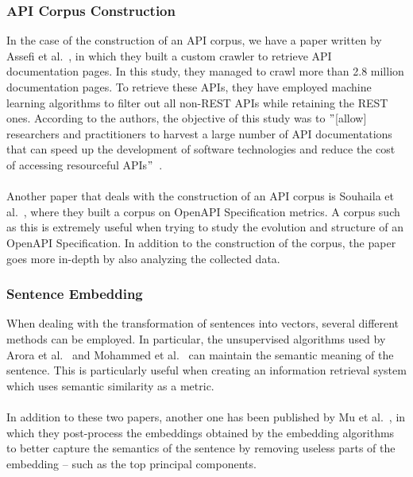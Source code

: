 \subsubsection{API Corpus Construction}
In the case of the construction of an API corpus, we have a paper written by Assefi et al.~\cite{assefi_intelligent_2022}, in which they built a custom crawler to retrieve API documentation pages.
In this study, they managed to crawl more than 2.8 million documentation pages.
To retrieve these APIs, they have employed machine learning algorithms to filter out all non-REST APIs while retaining the REST ones.
According to the authors, the objective of this study was to \("\)[allow] researchers and practitioners to harvest a large number of API documentations that can speed up the development of software technologies and reduce the cost of accessing resourceful APIs\("\)~\cite{assefi_intelligent_2022}. \\ \\
Another paper that deals with the construction of an API corpus is Souhaila et al.~\cite{souhaila_serbout_apistic_2024}, where they built a corpus on OpenAPI Specification metrics.
A corpus such as this is extremely useful when trying to study the evolution and structure of an OpenAPI Specification.
In addition to the construction of the corpus, the paper goes more in-depth by also analyzing the collected data.

\subsubsection{Sentence Embedding}
When dealing with the transformation of sentences into vectors, several different methods can be employed.
In particular, the unsupervised algorithms used by Arora et al.~\cite{arora_simple_2019} and Mohammed et al.~\cite{mohammed_state---art_2021} can maintain the semantic meaning of the sentence.
This is particularly useful when creating an information retrieval system which uses semantic similarity as a metric. \\ \\
In addition to these two papers, another one has been published by Mu et al.~\cite{mu_all-but--top_2018}, in which they post-process the embeddings obtained by the embedding algorithms to better capture the semantics of the sentence by removing useless parts of the embedding -- such as the top principal components.

